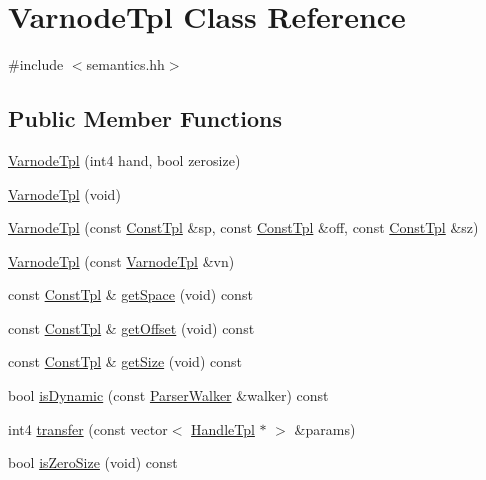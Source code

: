 \hypertarget{class_varnode_tpl}{}\section{Varnode\+Tpl Class Reference}
\label{class_varnode_tpl}


{\ttfamily \#include $<$semantics.\+hh$>$}

\subsection*{Public Member Functions}
\begin{DoxyCompactItemize}
\item 
\mbox{\hyperlink{class_varnode_tpl_ad569769b7b2b38750b2a7c95cdb0918c}{Varnode\+Tpl}} (int4 hand, bool zerosize)
\item 
\mbox{\hyperlink{class_varnode_tpl_acf006789c71e0140f4c9b23df12d49bb}{Varnode\+Tpl}} (void)
\item 
\mbox{\hyperlink{class_varnode_tpl_aba58713dad10cec86f4a9a9936d19f89}{Varnode\+Tpl}} (const \mbox{\hyperlink{class_const_tpl}{Const\+Tpl}} \&sp, const \mbox{\hyperlink{class_const_tpl}{Const\+Tpl}} \&off, const \mbox{\hyperlink{class_const_tpl}{Const\+Tpl}} \&sz)
\item 
\mbox{\hyperlink{class_varnode_tpl_ae4523006f0e3dfba71a4ff2870ee0b05}{Varnode\+Tpl}} (const \mbox{\hyperlink{class_varnode_tpl}{Varnode\+Tpl}} \&vn)
\item 
const \mbox{\hyperlink{class_const_tpl}{Const\+Tpl}} \& \mbox{\hyperlink{class_varnode_tpl_a8e64fde8b1b76550d7bec9ad48cce669}{get\+Space}} (void) const
\item 
const \mbox{\hyperlink{class_const_tpl}{Const\+Tpl}} \& \mbox{\hyperlink{class_varnode_tpl_a451245a703d57112521947df5336574d}{get\+Offset}} (void) const
\item 
const \mbox{\hyperlink{class_const_tpl}{Const\+Tpl}} \& \mbox{\hyperlink{class_varnode_tpl_ad40485cfdd6a2e6bc2e2d62df26c664b}{get\+Size}} (void) const
\item 
bool \mbox{\hyperlink{class_varnode_tpl_a2a8ab3751ee12b01f405e377911b3098}{is\+Dynamic}} (const \mbox{\hyperlink{class_parser_walker}{Parser\+Walker}} \&walker) const
\item 
int4 \mbox{\hyperlink{class_varnode_tpl_a693d67734f6eb8c72419db6c7e977b6e}{transfer}} (const vector$<$ \mbox{\hyperlink{class_handle_tpl}{Handle\+Tpl}} $\ast$ $>$ \&params)
\item 
bool \mbox{\hyperlink{class_varnode_tpl_afb237a19b4a1a81572066ecec94bfa14}{is\+Zero\+Size}} (void) const

\end{DoxyCompactItemize}
